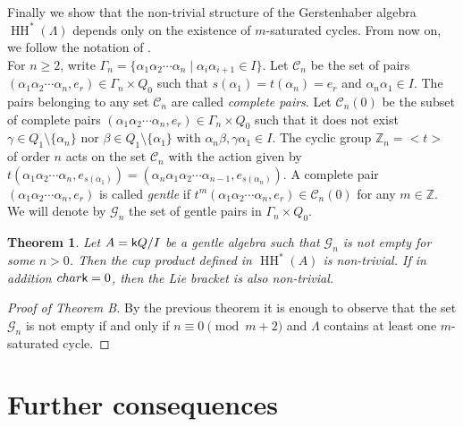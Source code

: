 \documentclass{amsart}
\theoremstyle{plain}
\newtheorem{teo}{Theorem}[section]
\theoremstyle{definition}
\begin{document}
Finally we show that the non-trivial structure of the Gerstenhaber algebra $\operatorname{HH}^*(\Lambda)$ depends only on the existence of $m$-saturated cycles. From now on, we follow the notation of \cite{RR15}. \\

For $n\geq 2$, write ${\Gamma}_n=\{\alpha_1\alpha_2\cdots\alpha_n\mid  \alpha_i\alpha_{i+1}\in I\}$.
  Let $\mathcal{C}_n$ be the set of  pairs  $(\alpha_1\alpha_2\cdots\alpha_n, e_r) \in {\Gamma}_n\times Q_0$ such that $s(\alpha_1)=t(\alpha_n)=e_r$ and $\alpha_n\alpha_1\in I$. The pairs belonging to  any set $\mathcal{C}_n$ are called \textit{complete pairs}. Let $\mathcal{C}_n(0)$ be the subset of complete pairs $(\alpha_1\alpha_2\cdots\alpha_n, e_r) \in {\Gamma}_n\times Q_0$ such that  it does not exist $\gamma\in Q_1\setminus\{\alpha_n\}$  nor $\beta\in Q_1\setminus\{\alpha_1\}$  with $\alpha_n\beta, \gamma\alpha_1\in I$.
The cyclic group $\mathbb{Z}_n=<t>$ of order $n$ acts on the set  $\mathcal{C}_n$ with the action given by $t(\alpha_1\alpha_2\cdots\alpha_n, e_{s(\alpha_1)})=(\alpha_n\alpha_1\alpha_2\cdots\alpha_{n-1}, e_{s(\alpha_n)})$. A complete pair $(\alpha_1\alpha_2\cdots\alpha_n, e_r)$ is called  \textit{gentle} if $t^m(\alpha_1\alpha_2\cdots\alpha_n, e_r)\in \mathcal{C}_n(0)$ for any $m\in \mathbb{Z}$.  We will denote by  $\mathcal G_{n}$  the set of gentle pairs in ${\Gamma}_n\times Q_0$.\\

\begin{teo}\cite[Theorems 4.5 and 4.9]{RR15}\label{gerstenhaberstructure}
Let $A={{\normalfont{\textsf{k}}}} Q/I$ be a gentle algebra such that $\mathcal G_{n}$ is not empty for some $n>0$. Then the cup product defined in $\operatorname{HH}^*(A)$   is non-trivial. If in addition $char{{\normalfont{\textsf{k}}}}=0$, then the Lie bracket is also non-trivial.
\end{teo}

\begin{proof}[Proof of Theorem B] By the previous theorem 
it is enough to observe that the set $\mathcal G_{n}$ is not empty if and only if $n\equiv 0\pmod{m+2}$ and $\Lambda$ contains at least one $m$-saturated cycle.

\end{proof}

\section{Further consequences}
\end{document}
